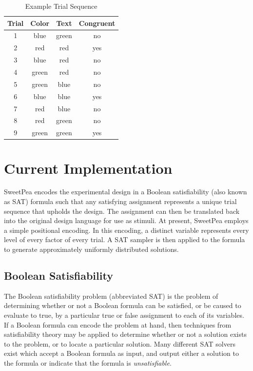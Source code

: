 \begin{table}[b]
  \centering
  \caption{Example Trial Sequence}
\begin{tabular}{|c|c|c|c|}
\hline
Trial & Color & Text  & Congruent \\ \hline
1     & blue  & green & no        \\ \hline
2     & red   & red   & yes       \\ \hline
3     & blue  & red   & no        \\ \hline
4     & green & red   & no        \\ \hline
5     & green & blue  & no        \\ \hline
6     & blue  & blue  & yes       \\ \hline
7     & red   & blue  & no        \\ \hline
8     & red   & green & no        \\ \hline
9     & green & green & yes       \\ \hline
\end{tabular}
\label{tab:example_sequence}
\end{table}


\section{Current Implementation}

SweetPea encodes the experimental design in a Boolean satisfiability (also known as SAT) formula such that any satisfying assignment represents a unique trial sequence that upholds the design. The assignment can then be translated back into the original design language for use as stimuli. At present, SweetPea employs a simple positional encoding. In this encoding, a distinct variable represents every level of every factor of every trial. A SAT sampler is then applied to the formula to generate approximately uniformly distributed solutions.

\subsection{Boolean Satisfiability}

The Boolean satisfiability problem (abbreviated SAT) is the problem of determining whether or not a Boolean formula can be satisfied, or be caused to evaluate to true, by a particular true or false assignment to each of its variables. If a Boolean formula can encode the problem at hand, then techniques from satisfiability theory may be applied to determine whether or not a solution exists to the problem, or to locate a particular solution. Many different SAT solvers exist which accept a Boolean formula as input, and output either a solution to the formula or indicate that the formula is \textit{unsatisfiable}.

